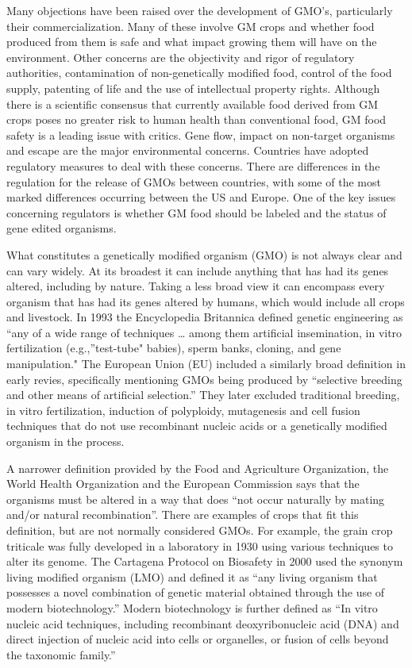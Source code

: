 Many objections have been raised over the development of GMO's, particularly their commercialization. Many of these involve GM crops and whether food produced from them is safe and what impact growing them will have on the environment. Other concerns are the objectivity and rigor of regulatory authorities, contamination of non-genetically modified food, control of the food supply, patenting of life and the use of intellectual property rights. Although there is a scientific consensus that currently available food derived from GM crops poses no greater risk to human health than conventional food, GM food safety is a leading issue with critics. Gene flow, impact on non-target organisms and escape are the major environmental concerns. Countries have adopted regulatory measures to deal with these concerns. There are differences in the regulation for the release of GMOs between countries, with some of the most marked differences occurring between the US and Europe. One of the key issues concerning regulators is whether GM food should be labeled and the status of gene edited organisms.

What constitutes a genetically modified organism (GMO) is not always clear and can vary widely. At its broadest it can include anything that has had its genes altered, including by nature. Taking a less broad view it can encompass every organism that has had its genes altered by humans, which would include all crops and livestock. In 1993 the Encyclopedia Britannica defined genetic engineering as ``any of a wide range of techniques \ldots{} among them artificial insemination, in vitro fertilization (e.g.,''test-tube" babies), sperm banks, cloning, and gene manipulation." The European Union (EU) included a similarly broad definition in early revies, specifically mentioning GMOs being produced by ``selective breeding and other means of artificial selection.'' They later excluded traditional breeding, in vitro fertilization, induction of polyploidy, mutagenesis and cell fusion techniques that do not use recombinant nucleic acids or a genetically modified organism in the process.

A narrower definition provided by the Food and Agriculture Organization, the World Health Organization and the European Commission says that the organisms must be altered in a way that does ``not occur naturally by mating and/or natural recombination''. There are examples of crops that fit this definition, but are not normally considered GMOs. For example, the grain crop triticale was fully developed in a laboratory in 1930 using various techniques to alter its genome. The Cartagena Protocol on Biosafety in 2000 used the synonym living modified organism (LMO) and defined it as ``any living organism that possesses a novel combination of genetic material obtained through the use of modern biotechnology.'' Modern biotechnology is further defined as ``In vitro nucleic acid techniques, including recombinant deoxyribonucleic acid (DNA) and direct injection of nucleic acid into cells or organelles, or fusion of cells beyond the taxonomic family.''

